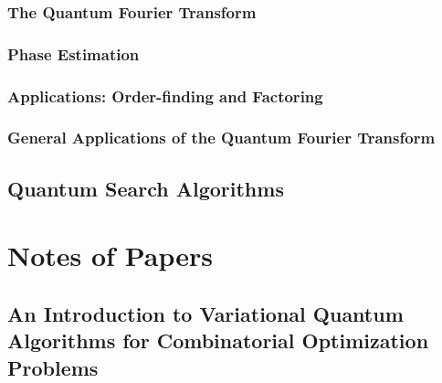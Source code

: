 \documentclass[
	11pt, %
	a4paper, %
]{LegrandOrangeBook}
\begin{document}
    \section{The Quantum Fourier Transform}
    

    \section{Phase Estimation}
    

    \section{Applications: Order-finding and Factoring}

    \section{General Applications of the Quantum Fourier Transform}
    

\chapter{Quantum Search Algorithms}


\part{Notes of Papers}

\chapter{An Introduction to Variational Quantum Algorithms for Combinatorial Optimization Problems}

\end{document}
